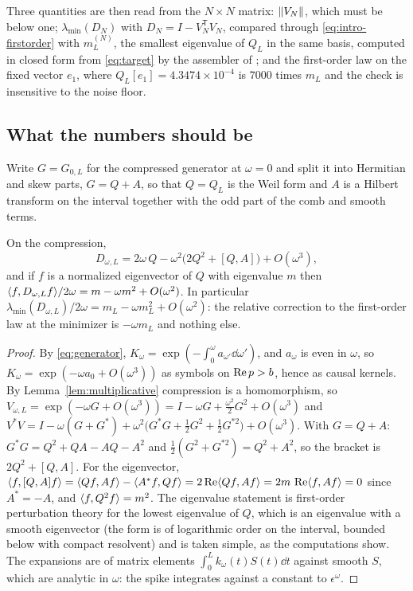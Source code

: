 Three quantities are then read from the $N\times N$ matrix: $\lVert V_N\rVert$,
which must be below one; $\lambda_{\min}(D_N)$ with $D_N=I-V_N^{\mathsf T}V_N$,
compared through \eqref{eq:intro-firstorder} with $m_L^{(N)}$, the smallest
eigenvalue of $Q_L$ in the same basis, computed in closed form from
\eqref{eq:target} by the assembler of \cite{FrameBound}; and the first-order
law on the fixed vector $e_1$, where $Q_L[e_1]=4.3474\times10^{-4}$ is $7000$
times $m_L$ and the check is insensitive to the noise floor.

\subsection{What the numbers should be}\label{sec:theory}

Write $G=G_{0,L}$ for the compressed generator at $\omega=0$ and split it into
Hermitian and skew parts, $G=Q+A$, so that $Q=Q_L$ is the Weil form and $A$ is
a Hilbert transform on the interval together with the odd part of the comb and
smooth terms.

\begin{proposition}\label{prop:secondorder}
On the compression,
\begin{equation}\label{eq:secondorder}
 D_{\omega,L}=2\omega\,Q-\omega^2\big(2Q^2+[Q,A]\big)+O(\omega^3),
\end{equation}
and if $f$ is a normalized eigenvector of $Q$ with eigenvalue $m$ then
$\langle f,D_{\omega,L}f\rangle/2\omega=m-\omega m^2+O(\omega^2)$. In particular
$\lambda_{\min}(D_{\omega,L})/2\omega=m_L-\omega m_L^2+O(\omega^2)$: the relative
correction to the first-order law at the minimizer is $-\omega m_L$ and
nothing else.
\end{proposition}
\begin{proof}
By \eqref{eq:generator}, $K_\omega=\exp(-\int_0^\omega a_{\omega'}\dd\omega')$,
and $a_\omega$ is even in $\omega$, so $K_\omega=\exp(-\omega a_0+O(\omega^3))$
as symbols on $\operatorname{Re} p>b$, hence as causal kernels. By
Lemma~\ref{lem:multiplicative} compression is a homomorphism, so
$V_{\omega,L}=\exp(-\omega G+O(\omega^3))=I-\omega G+\frac{\omega^2}2G^2+O(\omega^3)$
and
$V^*V=I-\omega(G+G^*)+\omega^2\big(G^*G+\frac12G^2+\frac12G^{*2}\big)+O(\omega^3)$.
With $G=Q+A$: $G^*G=Q^2+QA-AQ-A^2$ and $\frac12(G^2+G^{*2})=Q^2+A^2$, so the
bracket is $2Q^2+[Q,A]$. For the eigenvector,
$\langle f,[Q,A]f\rangle=\langle Qf,Af\rangle-\langle A^*f,Qf\rangle=2\operatorname{Re}\langle Qf,Af\rangle=2m\,\operatorname{Re}\langle f,Af\rangle=0$ since $A^*=-A$,
and $\langle f,Q^2f\rangle=m^2$. The eigenvalue statement is first-order perturbation
theory for the lowest eigenvalue of $Q$, which is an eigenvalue with a smooth
eigenvector (the form is of logarithmic order on the interval, bounded below
with compact resolvent) and is taken simple, as the computations show. The
expansions are of matrix elements $\int_0^Lk_\omega(t)S(t)\dd t$ against smooth
$S$, which are analytic in $\omega$: the spike integrates against a constant to
$\epsilon^\omega$.
\end{proof}

